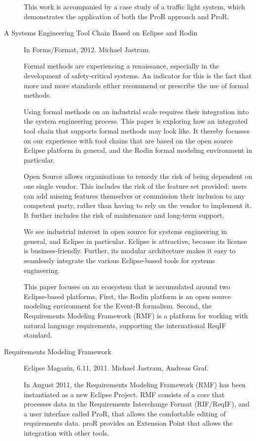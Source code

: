 \begin{description}
This work is accompanied by a case study of a traffic light system, which demonstrates the application of both the ProR approach and ProR.

\item[A Systems Engineering Tool Chain Based on Eclipse and Rodin] In Forms/Format, 2012. Michael Jastram.

Formal methods are experiencing a renaissance, especially in the development of safety-critical systems. An indicator for this is the fact that more and more standards either recommend or prescribe the use of formal methods.

Using formal methods on an industrial scale requires their integration into the system engineering process. This paper is exploring how an integrated tool chain that supports formal methods may look like. It thereby focusses on our experience with tool chains that are based on the open source Eclipse platform in general, and the Rodin formal modeling environment in particular.

Open Source allows organisations to remedy the risk of being dependent on one single vendor. This includes the risk of the feature set provided: users can add missing features themselves or commission their inclusion to any competent party, rather than having to rely on the vendor to implement it. It further includes the risk of maintenance and long-term support.

We see industrial interest in open source for systems engineering in general, and Eclipse in particular. Eclipse is attractive, because its license is business-friendly. Further, its modular architecture makes it easy to seamlessly integrate the various Eclipse-based tools for systems engineering.

This paper focuses on an ecosystem that is accumulated around two Eclipse-based platforms, First, the Rodin platform is an open source modeling environment for the Event-B formalism. Second, the Requirements Modeling Framework (RMF) is a platform for working with natural language requirements, supporting the international ReqIF standard.

\item[Requirements Modeling Framework] Eclipse Magazin, 6.11, 2011. Michael Jastram, Andreas Graf.

In August 2011, the Requirements Modeling Framework (RMF) has been instantiated as a new Eclipse Project.  RMF consists of a core that processes data in the Requirements Interchange Format (RIF/ReqIF), and a user interface called ProR, that allows the comfortable editing of requirements data.  proR provides an Extension Point that allows the integration with other tools.


\end{description}

